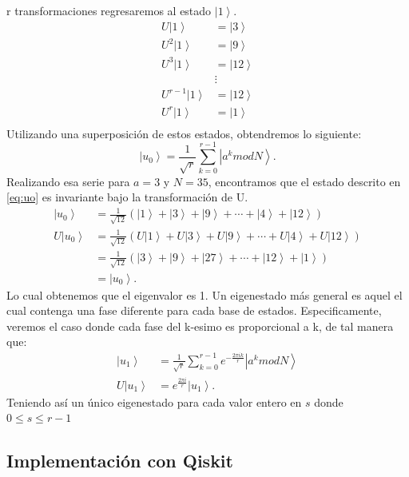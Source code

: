 r transformaciones regresaremos al estado $\left|1\right\rangle$.
\begin{align*}
    U\left| 1 \right\rangle &= \left|3\right\rangle \\
    U^2\left| 1 \right\rangle &= \left|9\right\rangle \\
    U^3\left| 1 \right\rangle &= \left|12\right\rangle \\ 
                    & \vdots  \\ 
    U^{r-1}\left| 1 \right\rangle &= \left|12\right\rangle \\
    U^r\left| 1 \right\rangle &= \left|1\right\rangle \\
\end{align*}
Utilizando una superposición de estos estados, obtendremos lo siguiente:
\begin{equation}
    \left| u_0 \right\rangle = \frac{1}{\sqrt{r}} \sum\limits_{k=0}^{r-1} \left|a^k mod N \right\rangle.
    \label{eq:u0}
\end{equation}
Realizando esa serie para $a=3$ y $N=35$, encontramos que el estado descrito en \ref{eq:uo} es invariante bajo la transformación de U.
\begin{align*}
    \left| u_0 \right\rangle &= \frac{1}{\sqrt{12}} \left(\left|1\right\rangle + \left|3\right\rangle+ \left|9\right\rangle 
    +\cdots +\left|4\right\rangle + \left|12\right\rangle \right)\\
    U\left| u_0 \right\rangle &= \frac{1}{\sqrt{12}} \left(U\left|1\right\rangle + U\left|3\right\rangle+ U\left|9\right\rangle 
    +\cdots +U\left|4\right\rangle + U\left|12\right\rangle \right)\\
    &= \frac{1}{\sqrt{12}} \left(\left|3\right\rangle + \left|9\right\rangle+ \left|27\right\rangle 
    +\cdots +\left|12\right\rangle + \left|1\right\rangle \right)\\
    &= \left| u_0 \right\rangle .
\end{align*}
Lo cual obtenemos que el eigenvalor es 1. Un eigenestado más general es aquel el cual contenga una fase diferente para cada base de estados. Especificamente, veremos el caso
donde cada fase del k-esimo es proporcional a k, de tal manera que:
\begin{align}
    \label{eq:u1}
    \left| u_1 \right\rangle &= \frac{1}{\sqrt{r}} \sum\limits_{k=0}^{r-1} e^{-\frac{2\pi i k}{r}} \left| a^k mod N \right\rangle \\
    \label{eq:ua1}
    U\left| u_1 \right\rangle &= e^{\frac{2\pi i}{r}} \left| u_1 \right\rangle.
\end{align}
Teniendo así un único eigenestado para cada valor entero en $s$ donde $0\leq s \leq r-1 $
\subsection{Implementación con Qiskit}